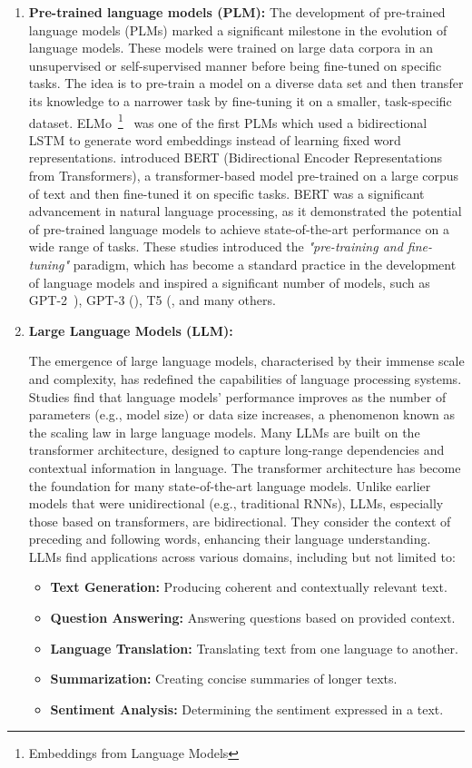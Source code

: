 \begin{enumerate}
	\item \textbf{Pre-trained language models (PLM):} {The development of pre-trained language models (PLMs) marked a significant milestone in the evolution of language models.
		      These models were trained on large data corpora in an unsupervised or self-supervised manner before being fine-tuned on specific tasks. The idea is to pre-train a model on a diverse data set and then transfer its knowledge to a narrower task by fine-tuning it on a smaller, task-specific dataset.
		      ELMo~\footnote{Embeddings from Language Models}~\cite{peters2018deep} was one of the first PLMs which used a bidirectional LSTM to generate word embeddings instead of learning fixed word representations.
		      \textcite{devlin2019bert} introduced BERT (Bidirectional Encoder Representations from Transformers), a transformer-based model pre-trained on a large corpus of text and then fine-tuned it on specific tasks.
		      BERT was a significant advancement in natural language processing, as it demonstrated the potential of pre-trained language models to achieve state-of-the-art performance on a wide range of tasks.
		      These studies introduced the \textit{"pre-training and fine-tuning"} paradigm, which has become a standard practice in the development of language models and inspired a significant number of models, such as GPT-2~\cite{radford2019language}), GPT-3 (\textcite{brown2020language}), T5 (\textcite{raffel2023exploring}, and many others.
	      }
	\item \textbf{Large Language Models (LLM):} {The emergence of large language models, characterised by their immense scale and complexity, has redefined the capabilities of language processing systems.
		      Studies find that language models' performance improves as the number of parameters (e.g., model size) or data size increases, a phenomenon known as the scaling law in large language models.
		      Many LLMs are built on the transformer architecture, designed to capture long-range dependencies and contextual information in language.
		      The transformer architecture has become the foundation for many state-of-the-art language models. Unlike earlier models that were unidirectional (e.g., traditional RNNs), LLMs, especially those based on transformers, are bidirectional. They consider the context of preceding and following words, enhancing their language understanding.
		      LLMs find applications across various domains, including but not limited to:
		      \begin{itemize}
			      \item \textbf{Text Generation:} Producing coherent and contextually relevant text.
			      \item \textbf{Question Answering:} Answering questions based on provided context.
			      \item \textbf{Language Translation:} Translating text from one language to another.
			      \item \textbf{Summarization:} Creating concise summaries of longer texts.
			      \item \textbf{Sentiment Analysis:} Determining the sentiment expressed in a text.
		      \end{itemize}

}
\end{enumerate}
